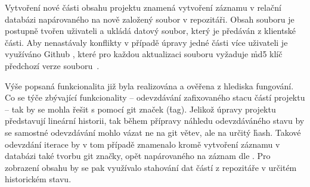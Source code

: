Vytvoření nové části obsahu projektu znamená vytvoření záznamu v relační databázi napárovaného na nově založený soubor v repozitáři.
Obsah souboru je postupně tvořen uživateli a ukládá datový  soubor, který je předáván z klientské části.
Aby nenastávaly konflikty v případě úpravy jedné části více uživateli je využíváno Github , které pro každou aktualizaci souboru vyžaduje \h{md5} klíč předchozí verze souboru~\cite{githubupdate}.

Výše popsaná funkcionalita již byla realizována a ověřena z hlediska fungování.
Co se týče zbývající funkcionality – odevzdávání zafixovaného stacu částí projektu – tak by se mohla řešit s pomocí git značek (\h{tag}).
Jelikož úpravy projektu představují lineární historii, tak během přípravy náhledu odevzdáváného stavu by se samostné odevzdávání mohlo vázat ne na git větev, ale na určitý \h{hash}.
Takové odevzdání iterace by v tom případě znamenalo kromě vytvoření záznamu v databázi také tvorbu git značky, opět napárovaného na záznam dle .
Pro zobrazení obsahu by se pak využívalo stahování dat částí z repozitáře v určitém historickém stavu.
